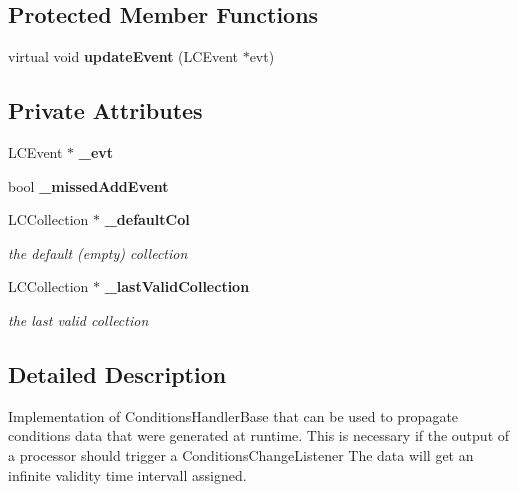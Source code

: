 \subsection*{Protected Member Functions}
\begin{DoxyCompactItemize}
\item 
virtual void {\bfseries updateEvent} (LCEvent $\ast$evt)\label{classCALICE_1_1RunTimeConditionsHandler_a9e896232b8fa2153fd51524efb11c3a9}

\end{DoxyCompactItemize}
\subsection*{Private Attributes}
\begin{DoxyCompactItemize}
\item 
LCEvent $\ast$ {\bfseries \_\-evt}\label{classCALICE_1_1RunTimeConditionsHandler_a0d779f9c8f24741a487848089cfbd9da}

\item 
bool {\bfseries \_\-missedAddEvent}\label{classCALICE_1_1RunTimeConditionsHandler_ac1245dfab8ccb6a2464d7e9105da3326}

\item 
LCCollection $\ast$ {\bf \_\-defaultCol}\label{classCALICE_1_1RunTimeConditionsHandler_a9dc518975a177949967cca8853c14f3b}

\begin{DoxyCompactList}\small\item\em the default (empty) collection \item\end{DoxyCompactList}\item 
LCCollection $\ast$ {\bf \_\-lastValidCollection}\label{classCALICE_1_1RunTimeConditionsHandler_a1b2f0d346ce096596e7f703306d2f091}

\begin{DoxyCompactList}\small\item\em the last valid collection \item\end{DoxyCompactList}\end{DoxyCompactItemize}


\subsection{Detailed Description}
Implementation of ConditionsHandlerBase that can be used to propagate conditions data that were generated at runtime. This is necessary if the output of a processor should trigger a ConditionsChangeListener The data will get an infinite validity time intervall assigned.\par


